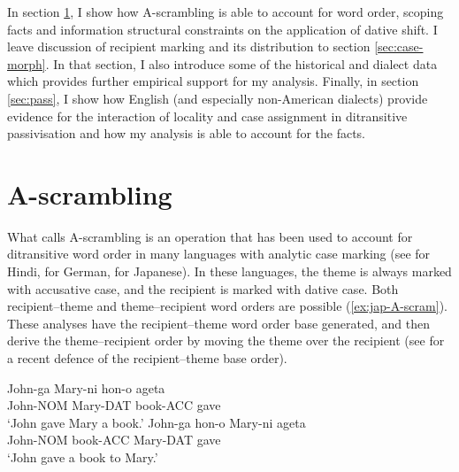 In section \ref{sec:Ascram}, I show how A-scrambling is able to account for word order, scoping facts and information structural constraints on the application of dative shift. I leave discussion of recipient marking and its distribution to section \ref{sec:case-morph}. In that section, I also introduce some of the historical and dialect data which provides further empirical support for my analysis. Finally, in section \ref{sec:pass}, I show how English (and especially non-American dialects) provide evidence for the interaction of locality and case assignment in ditransitive passivisation and how my analysis is able to account for the facts.

\section{A-scrambling}\label{sec:Ascram}

What \cite{McGinnis.1998} calls A-scrambling is an operation that has been used to account for ditransitive word order in many languages with analytic case marking (see \cite{Mahajan.1990} for Hindi, \cite{Webelhuth.1984,Webelhuth.1989,Grewendorf.1990b} for German, \cite{Takano.1998} for Japanese). In these languages, the theme is always marked with accusative case, and the recipient is marked with dative case. Both recipient--theme and theme--recipient word orders are possible (\ref{ex:jap-A-scram}). These analyses have the recipient--theme word order base generated, and then derive the theme--recipient order by moving the theme over the recipient (see \cite{Georgala.2011} for a recent defence of the recipient--theme base order). 
\begin{exe}
\ex\label{ex:jap-A-scram} \cite[ex. 6]{Takano.1998}
\begin{xlist}
\ex \gll John-ga Mary-ni hon-o ageta\\
John-NOM Mary-DAT book-ACC gave\\
\trans `John gave Mary a book.'
\ex \gll John-ga hon-o Mary-ni ageta\\
John-NOM book-ACC Mary-DAT gave\\
\trans `John gave a book to Mary.'
\end{xlist}
\end{exe}%


